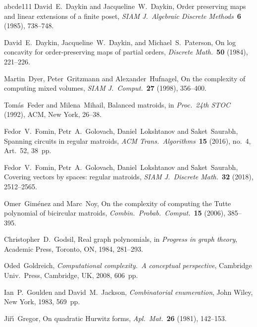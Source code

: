 \documentclass[11pt]{amsart}
\theoremstyle{definition}
\numberwithin{figure}{section}
\numberwithin{equation}{section}
\def\ts{\hskip.03cm}
\def\ts{\hskip.03cm}
\begin{document}
{\begin{thebibliography}{abcde111}
David~E.~Daykin and Jacqueline~W.~Daykin,
Order preserving maps and linear extensions of a finite poset,
\emph{SIAM J.\ Algebraic Discrete Methods}~\textbf{6} (1985), 738--748.

David~E.~Daykin,  Jacqueline~W.~Daykin,  and Michael~S.~Paterson,
On log concavity for order-preserving maps of partial orders,
\emph{Discrete Math.}~\textbf{50} (1984), 221--226.

Martin~Dyer, Peter~Gritzmann and Alexander~Hufnagel,
On the complexity of computing mixed volumes,
\emph{SIAM J.\ Comput.}~\textbf{27} (1998), 356--400.


Tom\'as~Feder and Milena~Mihail, Balanced matroids,
in \emph{Proc.\ 24th STOC} (1992), ACM, New York, 26--38.


Fedor~V.~Fomin, Petr~A.~Golovach, Daniel~Lokshtanov and Saket~Saurabh,
Spanning circuits in regular matroids,
\emph{ACM Trans.\ Algorithms}~\textbf{15} (2016), no.~4, Art.~52, 38~pp.

Fedor~V.~Fomin, Petr~A.~Golovach, Daniel~Lokshtanov and Saket~Saurabh,
Covering vectors by spaces: regular matroids, \emph{SIAM J.\
Discrete Math.}~\textbf{32} (2018), 2512--2565.

Omer~Gim\'enez and Marc~Noy,
On the complexity of computing the Tutte polynomial of bicircular matroids,
\emph{Combin.\ Probab.\ Comput.}~\textbf{15} (2006), 385--395.

Christopher~D.~Godsil,
Real graph polynomials, in \emph{Progress in graph theory},
Academic Press, Toronto, ON, 1984, 281--293.

Oded~Goldreich,
\emph{Computational complexity.\ A conceptual perspective},
Cambridge Univ.\ Press, Cambridge, UK, 2008, 606~pp.

Ian~P.~Goulden and David~M.~Jackson,
\emph{Combinatorial enumeration},
John Wiley, New York, 1983, 569~pp.

Ji\v{r}\'{\i}~Gregor, On quadratic Hurwitz forms,
\emph{Apl.\ Mat.}~\textbf{26} (1981),  142--153.


\end{thebibliography}}
\end{document}
